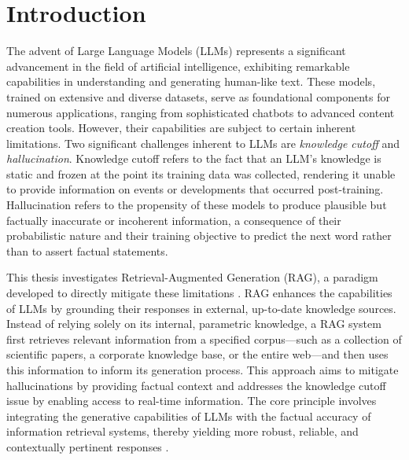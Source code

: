 \chapter{Introduction}
\label{chap:introduction}

The advent of Large Language Models (LLMs) represents a significant advancement in the field of artificial intelligence, exhibiting remarkable capabilities in understanding and generating human-like text. These models, trained on extensive and diverse datasets, serve as foundational components for numerous applications, ranging from sophisticated chatbots to advanced content creation tools. However, their capabilities are subject to certain inherent limitations. Two significant challenges inherent to LLMs are \textit{knowledge cutoff} and \textit{hallucination}. Knowledge cutoff refers to the fact that an LLM's knowledge is static and frozen at the point its training data was collected, rendering it unable to provide information on events or developments that occurred post-training. Hallucination refers to the propensity of these models to produce plausible but factually inaccurate or incoherent information, a consequence of their probabilistic nature and their training objective to predict the next word rather than to assert factual statements.

This thesis investigates Retrieval-Augmented Generation (RAG), a paradigm developed to directly mitigate these limitations \autocite{lewis2021retrievalaugmentedgenerationknowledgeintensivenlp}. RAG enhances the capabilities of LLMs by grounding their responses in external, up-to-date knowledge sources. Instead of relying solely on its internal, parametric knowledge, a RAG system first retrieves relevant information from a specified corpus—such as a collection of scientific papers, a corporate knowledge base, or the entire web—and then uses this information to inform its generation process. This approach aims to mitigate hallucinations by providing factual context and addresses the knowledge cutoff issue by enabling access to real-time information. The core principle involves integrating the generative capabilities of LLMs with the factual accuracy of information retrieval systems, thereby yielding more robust, reliable, and contextually pertinent responses \autocite{gao2024retrievalaugmentedgenerationlargelanguage}.

